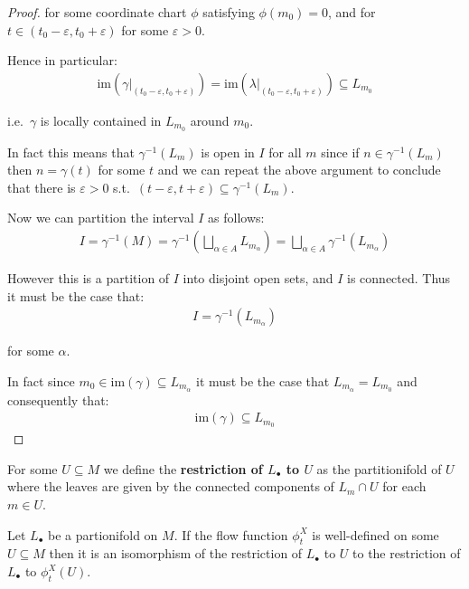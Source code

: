 \begin{proof}
        for some coordinate chart $\phi$ satisfying $\phi(m_0) = 0$, and for $t \in (t_0 - \varepsilon, t_0 + \varepsilon)$ for some $\varepsilon > 0$.

        Hence in particular:
        \begin{align*}
            \text{im}(\gamma|_{(t_0 - \varepsilon, t_0 + \varepsilon)}) = \text{im}(\lambda|_{(t_0 - \varepsilon, t_0 + \varepsilon)}) \subseteq L_{m_0}
        \end{align*}

        i.e.\ $\gamma$ is locally contained in $L_{m_0}$ around $m_0$.

        In fact this means that $\gamma^{-1}(L_{m})$ is open in $I$ for all $m$ since if $n \in \gamma^{-1}(L_{m})$ then $n = \gamma(t)$ for some $t$ and we can repeat the above argument to conclude that there is $\varepsilon > 0$ s.t.\ $(t - \varepsilon, t + \varepsilon) \subseteq \gamma^{-1}(L_m)$.

        Now we can partition the interval $I$ as follows:
        \begin{align*}
            I = \gamma^{-1}(M) = \gamma^{-1}\left(\bigsqcup_{\alpha \in A} L_{m_\alpha}\right) = \bigsqcup_{\alpha \in A} \gamma^{-1}(L_{m_\alpha})
        \end{align*}

        However this is a partition of $I$ into disjoint open sets, and $I$ is connected. Thus it must be the case that:
        \begin{align*}
            I = \gamma^{-1}(L_{m_\alpha})
        \end{align*}

        for some $\alpha$.

        In fact since $m_0 \in \text{im}(\gamma) \subseteq L_{m_\alpha}$ it must be the case that $L_{m_\alpha} = L_{m_0}$ and consequently that:
        \begin{align*}
            \text{im}(\gamma) \subseteq L_{m_0}
        \end{align*}
    \end{proof}

    \begin{definition}
        For some $U \subseteq M$ we define the \textbf{restriction of $L_\bullet$ to $U$} as the partitionifold of $U$ where the leaves are given by the connected components of $L_m \cap U$ for each $m \in U$.
    \end{definition}

    \begin{prop}
        Let $L_\bullet$ be a partionifold on $M$. If the flow function $\phi_t^X$ is well-defined on some $U \subseteq M$ then it is an isomorphism of the restriction of $L_\bullet$ to $U$ to the restriction of $L_\bullet$ to $\phi_t^X(U)$.
    \end{prop}
    
